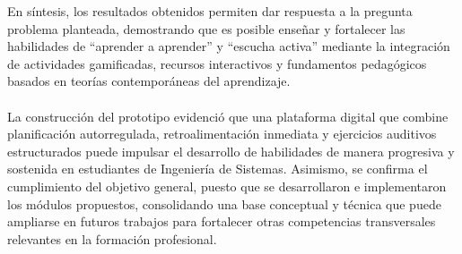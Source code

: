 En síntesis, los resultados obtenidos permiten dar respuesta a la pregunta problema planteada, demostrando que es posible enseñar y fortalecer las habilidades de “aprender a aprender” y “escucha activa” mediante la integración de actividades gamificadas, recursos interactivos y fundamentos pedagógicos basados en teorías contemporáneas del aprendizaje. 
\\
\\
La construcción del prototipo evidenció que una plataforma digital que combine planificación autorregulada, retroalimentación inmediata y ejercicios auditivos estructurados puede impulsar el desarrollo de habilidades de manera progresiva y sostenida en estudiantes de Ingeniería de Sistemas. Asimismo, se confirma el cumplimiento del objetivo general, puesto que se desarrollaron e implementaron los módulos propuestos, consolidando una base conceptual y técnica que puede ampliarse en futuros trabajos para fortalecer otras competencias transversales relevantes en la formación profesional.

\newpage